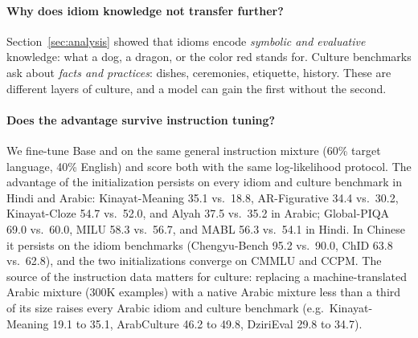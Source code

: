 \paragraph{Why does idiom knowledge not transfer further?}
Section~\ref{sec:analysis} showed that idioms encode \textit{symbolic and evaluative} knowledge: what a dog, a dragon, or the color red stands for. Culture benchmarks ask about \textit{facts and practices}: dishes, ceremonies, etiquette, history. These are different layers of culture, and a model can gain the first without the second. 

\paragraph{Does the advantage survive instruction tuning?}
We fine-tune Base and \idiomcpt{} on the same general instruction mixture (60\% target language, 40\% English) and score both with the same log-likelihood protocol. The advantage of the \idiomcpt{} initialization persists on every idiom and culture benchmark in Hindi and Arabic: Kinayat-Meaning 35.1 vs.\ 18.8, AR-Figurative 34.4 vs.\ 30.2, Kinayat-Cloze 54.7 vs.\ 52.0, and Alyah 37.5 vs.\ 35.2 in Arabic; Global-PIQA 69.0 vs.\ 60.0, MILU 58.3 vs.\ 56.7, and MABL 56.3 vs.\ 54.1 in Hindi. In Chinese it persists on the idiom benchmarks (Chengyu-Bench 95.2 vs.\ 90.0, ChID 63.8 vs.\ 62.8), and the two initializations converge on CMMLU and CCPM. The source of the instruction data matters for culture: replacing a machine-translated Arabic mixture (300K examples) with a native Arabic mixture less than a third of its size raises every Arabic idiom and culture benchmark (e.g.\ Kinayat-Meaning 19.1 to 35.1, ArabCulture 46.2 to 49.8, DziriEval 29.8 to 34.7). 

